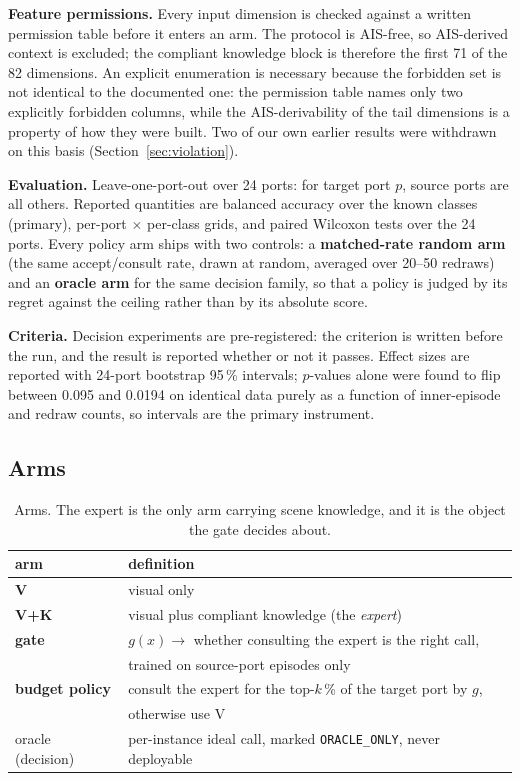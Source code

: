 \documentclass[journal]{IEEEtran}
\begin{document}
\textbf{Feature permissions.} Every input dimension is checked against a written permission table
before it enters an arm. The protocol is AIS-free, so AIS-derived context is excluded; the compliant
knowledge block is therefore the first 71 of the 82 dimensions. An explicit enumeration is necessary
because the forbidden set is not identical to the documented one: the permission table names only two
explicitly forbidden columns, while the AIS-derivability of the tail dimensions is a property of how
they were built. Two of our own earlier results were withdrawn on this basis
(Section~\ref{sec:violation}).

\textbf{Evaluation.} Leave-one-port-out over 24 ports: for target port $p$, source ports are all
others. Reported quantities are balanced accuracy over the known classes (primary), per-port $\times$
per-class grids, and paired Wilcoxon tests over the 24 ports. Every policy arm ships with two controls:
a \textbf{matched-rate random arm} (the same accept/consult rate, drawn at random, averaged over
20--50 redraws) and an \textbf{oracle arm} for the same decision family, so that a policy is judged by
its regret against the ceiling rather than by its absolute score.

\textbf{Criteria.} Decision experiments are pre-registered: the criterion is written before the run,
and the result is reported whether or not it passes. Effect sizes are reported with 24-port bootstrap
95\,\% intervals; $p$-values alone were found to flip between 0.095 and 0.0194 on identical data purely
as a function of inner-episode and redraw counts, so intervals are the primary instrument.

\subsection{Arms}

\begin{table}[t]
\caption{Arms. The expert is the only arm carrying scene knowledge, and it is the object the gate
decides about.}
\label{tab:arms}
\centering
\footnotesize
\begin{tabular}{@{}L{1.7cm}L{6.0cm}@{}}
\toprule
arm & definition \\
\midrule
\textbf{V} & visual only \\
\textbf{V+K} & visual plus compliant knowledge (the \emph{expert}) \\
\textbf{gate} & $g(x)\rightarrow$ whether consulting the expert is the right call, \\
          & trained on source-port episodes only \\
\textbf{budget policy} & consult the expert for the top-$k$\,\% of the target port by $g$, \\
          & otherwise use V \\
oracle (decision) & per-instance ideal call, marked \texttt{ORACLE\_ONLY}, never deployable \\
\bottomrule
\end{tabular}
\end{table}
\end{document}
